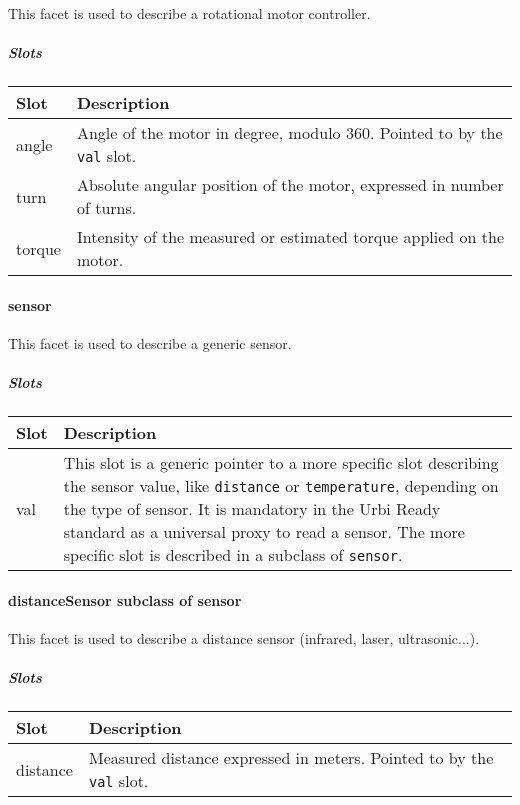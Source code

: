 \documentclass[a4paper]{article}
\begin{document}
This facet is used to describe a rotational motor controller.

\subparagraph{Slots}

\begin{flushleft}
\tablehead{}
\begin{supertabular}{|m{2.8669999cm}|m{12.422cm}|}
\hline
\sffamily\bfseries Slot &
\sffamily\bfseries Description\\\hline
angle &
\sffamily Angle of the motor in degree, modulo
360. Pointed to by the \texttt{val} slot.\\\hline
turn &
\sffamily Absolute angular position of the
motor, expressed in number of turns.\\\hline
torque &
\sffamily Intensity of the measured or estimated
torque applied on the motor.\\\hline
\end{supertabular}
\end{flushleft}
\paragraph{sensor}


This facet is used to describe a generic sensor.

\subparagraph{Slots}

\begin{flushleft}
\tablehead{}
\begin{supertabular}{|m{2.8669999cm}|m{12.422cm}|}
\hline
\sffamily\bfseries Slot &
\sffamily\bfseries Description\\\hline
val &
\sffamily This slot is a generic pointer to a
more specific slot describing the sensor value, like \texttt{distance}
or \texttt{temperature}, depending on the type of sensor. It is
mandatory in the Urbi Ready standard as a universal proxy to read a
sensor. The more specific slot is described in a subclass of
\texttt{sensor}.\\\hline
\end{supertabular}
\end{flushleft}
\paragraph{ distanceSensor  \textmd{subclass of sensor}}


This facet is used to describe a distance sensor (infrared, laser,
ultrasonic...).

\subparagraph{Slots}

\begin{flushleft}
\tablehead{}
\begin{supertabular}{|m{2.8669999cm}|m{12.422cm}|}
\hline
\sffamily\bfseries Slot &
\sffamily\bfseries Description\\\hline
distance &
\sffamily Measured distance expressed in meters.
Pointed to by the \texttt{val} slot.\\\hline
\end{supertabular}
\end{flushleft}
\end{document}
